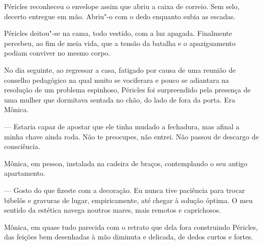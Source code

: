 Péricles reconheceu o envelope assim que abriu a caixa de correio. Sem
selo, decerto entregue em mão. Abriu"-o com o dedo enquanto subia as
escadas.

\begin{quotation}
\end{quotation}

Péricles deitou"-se na cama, todo vestido, com a luz apagada.
Finalmente percebeu, ao fim de meia vida, que a tensão da batalha e o
apaziguamento podiam conviver no mesmo corpo.

No dia seguinte, ao
regressar a casa, fatigado por causa de uma reunião de conselho
pedagógico na qual muito se vociferara e pouco se adiantara na
resolução de um problema espinhoso, Péricles foi surpreendido pela
presença de uma mulher que dormitava sentada no chão, do lado de fora da
porta. Era Mônica.

--- Estaria capaz de apostar que ele tinha mudado a fechadura, mas
  afinal a minha chave ainda roda. Não te preocupes, não entrei. Não
  passou de descargo de consciência.


Mônica, em pessoa, instalada na cadeira de braços, contemplando o seu
antigo apartamento.

--- Gosto do que fizeste com a decoração. Eu nunca tive paciência para
  trocar bibelôs e gravuras de lugar, empiricamente, até chegar à
  solução óptima. O meu sentido da estética navega noutros mares, mais
  remotos e caprichosos.


Mônica, em quase tudo parecida com o retrato que dela fora construindo
Péricles, das feições bem desenhadas à mão diminuta e delicada, de dedos
curtos e fortes.

